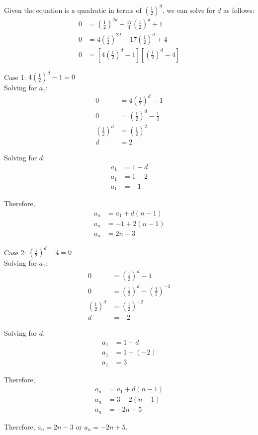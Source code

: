 \documentclass[12pt]{article}
\begin{document}
\begin{enumerate}
    Given the equation is a quadratic in terms of $(\frac{1}{2})^d$, we can solve for $d$ as follows:
    \begin{align*}
        0 & = (\frac{1}{2})^{2d} - \frac{17}{4}(\frac{1}{2})^{d} + 1 \\
        0 & = 4(\frac{1}{2})^{2d} - 17(\frac{1}{2})^{d} + 4 \\
        0 & = [4(\frac{1}{2})^d - 1][(\frac{1}{2})^d - 4]
    \end{align*}
    
    Case 1: $4(\frac{1}{2})^d - 1 = 0$ \\
    
    Solving for $a_1$:
    \begin{align*}
        0 & = 4(\frac{1}{2})^d - 1 \\
        0 & = (\frac{1}{2})^d - \frac{1}{4} \\
        (\frac{1}{2})^d & = (\frac{1}{2})^2 \\
        d & = 2
    \end{align*}
    
    Solving for $d$:
    \begin{align*}
        a_1 & = 1 - d \\
        a_1 & = 1 - 2 \\
        a_1 & = -1
    \end{align*}
    
    Therefore,
    \begin{align*}
        a_n & = a_1 + d(n - 1) \\
        a_n & = -1 + 2(n - 1) \\
        a_n & = 2n - 3
    \end{align*}
    
    Case 2: $(\frac{1}{2})^d - 4 = 0$ \\
    
    Solving for $a_1$:
    \begin{align*}
        0 & = (\frac{1}{2})^d - 1 \\
        0 & = (\frac{1}{2})^d - (\frac{1}{2})^{-2} \\
        (\frac{1}{2})^d & = (\frac{1}{2})^{-2} \\
        d & = -2
    \end{align*}
    
    Solving for $d$:
    \begin{align*}
        a_1 & = 1 - d \\
        a_1 & = 1 - (-2) \\
        a_1 & = 3
    \end{align*}
    
    Therefore,
    \begin{align*}
        a_n & = a_1 + d(n - 1) \\
        a_n & = 3 -2(n - 1) \\
        a_n & = -2n + 5
    \end{align*}
    
    Therefore, $a_n = 2n - 3$ or $a_n = -2n + 5$.
    
\end{enumerate}
\end{document}
